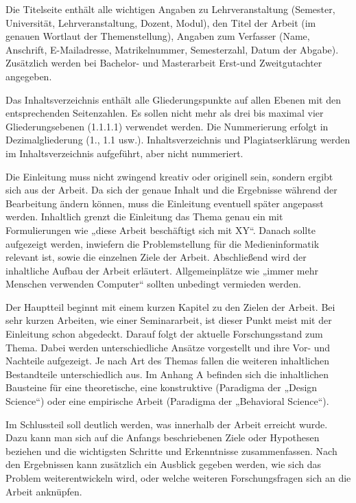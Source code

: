 
Die Titelseite enthält alle wichtigen Angaben zu Lehrveranstaltung (Semester, Universität, Lehrveranstaltung, Dozent, Modul), den Titel der Arbeit (im genauen Wortlaut der Themenstellung), Angaben zum Verfasser (Name, Anschrift, E-Mailadresse, Matrikelnummer, Semesterzahl, Datum der Abgabe).
Zusätzlich werden bei Bachelor- und Masterarbeit Erst-und Zweitgutachter angegeben.


Das Inhaltsverzeichnis enthält alle Gliederungspunkte auf allen Ebenen mit den entsprechenden Seitenzahlen.
Es sollen nicht mehr als drei bis maximal vier Gliederungsebenen (1.1.1.1) verwendet werden. Die Nummerierung erfolgt in Dezimalgliederung (1., 1.1 usw.).
Inhaltsverzeichnis und Plagiatserklärung werden im Inhaltsverzeichnis aufgeführt, aber nicht nummeriert.


Die Einleitung muss nicht zwingend kreativ oder originell sein, sondern ergibt sich aus der Arbeit.
Da sich der genaue Inhalt und die Ergebnisse während der Bearbeitung ändern können, muss die Einleitung eventuell später angepasst werden.
Inhaltlich grenzt die Einleitung das Thema genau ein mit Formulierungen wie „diese Arbeit beschäftigt sich mit XY“.
Danach sollte aufgezeigt werden, inwiefern die Problemstellung für die Medieninformatik relevant ist, sowie die einzelnen Ziele der Arbeit.
Abschließend wird der inhaltliche Aufbau der Arbeit erläutert.
Allgemeinplätze wie „immer mehr Menschen verwenden Computer“ sollten unbedingt vermieden werden.


Der Hauptteil beginnt mit einem kurzen Kapitel zu den Zielen der Arbeit.
Bei sehr kurzen Arbeiten, wie einer Seminararbeit, ist dieser Punkt meist mit der Einleitung schon abgedeckt.
Darauf folgt der aktuelle Forschungsstand zum Thema.
Dabei werden unterschiedliche Ansätze vorgestellt und ihre Vor- und Nachteile aufgezeigt.
Je nach Art des Themas fallen die weiteren inhaltlichen Bestandteile unterschiedlich aus.
Im Anhang A befinden sich die inhaltlichen Bausteine für eine theoretische, eine konstruktive (Paradigma der „Design Science“) oder eine empirische Arbeit (Paradigma der „Behavioral Science“).


Im Schlussteil soll deutlich werden, was innerhalb der Arbeit erreicht wurde.
Dazu kann man sich auf die Anfangs beschriebenen Ziele oder Hypothesen beziehen und die wichtigsten Schritte und Erkenntnisse zusammenfassen.
Nach den Ergebnissen kann zusätzlich ein Ausblick gegeben werden, wie sich das Problem weiterentwickeln wird, oder welche weiteren Forschungsfragen sich an die Arbeit anknüpfen.

